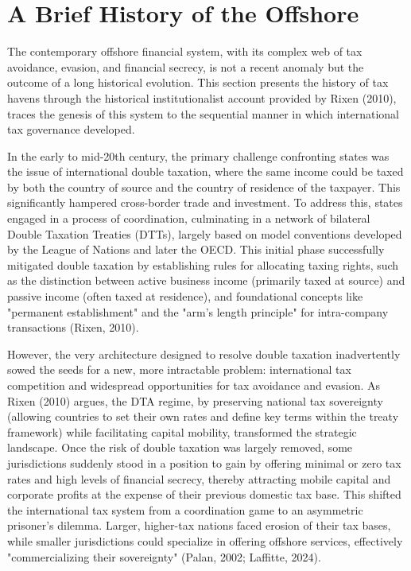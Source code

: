\section{A Brief History of the Offshore}
\label{sec:1_2}

The contemporary offshore financial system, with its complex web of tax avoidance, evasion, and financial secrecy, is not a recent anomaly but the outcome of a long historical evolution. This section presents the history of tax havens through the historical institutionalist account provided by Rixen (2010), traces the genesis of this system to the sequential manner in which international tax governance developed.

In the early to mid-20th century, the primary challenge confronting states was the issue of international double taxation, where the same income could be taxed by both the country of source and the country of residence of the taxpayer. This significantly hampered cross-border trade and investment. To address this, states engaged in a process of coordination, culminating in a network of bilateral Double Taxation Treaties (DTTs), largely based on model conventions developed by the League of Nations and later the OECD. This initial phase successfully mitigated double taxation by establishing rules for allocating taxing rights, such as the distinction between active business income (primarily taxed at source) and passive income (often taxed at residence), and foundational concepts like "permanent establishment" and the "arm's length principle" for intra-company transactions (Rixen, 2010).

However, the very architecture designed to resolve double taxation inadvertently sowed the seeds for a new, more intractable problem: international tax competition and widespread opportunities for tax avoidance and evasion. As Rixen (2010) argues, the DTA regime, by preserving national tax sovereignty (allowing countries to set their own rates and define key terms within the treaty framework) while facilitating capital mobility, transformed the strategic landscape. Once the risk of double taxation was largely removed, some jurisdictions suddenly stood in a position to gain by offering minimal or zero tax rates and high levels of financial secrecy, thereby attracting mobile capital and corporate profits at the expense of their previous domestic tax base. This shifted the international tax system from a coordination game to an asymmetric prisoner's dilemma. Larger, higher-tax nations faced erosion of their tax bases, while smaller jurisdictions could specialize in offering offshore services, effectively "commercializing their sovereignty" (Palan, 2002; Laffitte, 2024).

